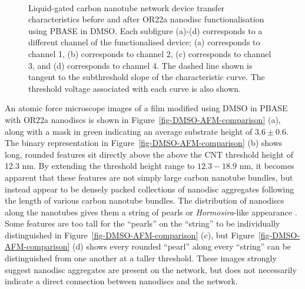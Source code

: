 \documentclass[
  a4paper,
]{scrbook}
\begin{document}
\begin{figure}
\begin{minipage}[t]{0.45\linewidth}
{{}

}

\end{minipage}%
%
\begin{minipage}[t]{0.01\linewidth}

{\centering 

~

}

\end{minipage}%

\caption{\label{fig-DMSO-TX}Liquid-gated carbon nanotube network device
transfer characteristics before and after OR22a nanodisc
functionalisation using PBASE in DMSO. Each subfigure (a)-(d)
corresponds to a different channel of the functionalised device; (a)
corresponds to channel 1, (b) corresponds to channel 2, (c) corresponds
to channel 3, and (d) corresponds to channel 4. The dashed line shown is
tangent to the subthreshold slope of the characteristic curve. The
threshold voltage associated with each curve is also shown.}

\end{figure}

An atomic force microscope images of a film modified using DMSO in PBASE
with OR22a nanodiscs is shown in Figure~\ref{fig-DMSO-AFM-comparison}
(a), along with a mask in green indicating an average substrate height
of \(3.6\pm0.6\). The binary representation in
Figure~\ref{fig-DMSO-AFM-comparison} (b) shows long, rounded features
sit directly above the above the CNT threshold height of 12.3 nm. By
extending the threshold height range to \(12.3-18.9\) nm, it becomes
apparent that these features are not simply large carbon nanotube
bundles, but instead appear to be densely packed collections of nanodisc
aggregates following the length of various carbon nanotube bundles. The
distribution of nanodiscs along the nanotubes gives them a string of
pearls or \emph{Hormosira}-like appearance
\autocite{NewZealandPlantConservationNetwork}. Some features are too
tall for the ``pearls'' on the ``string'' to be individually
distinguished in Figure~\ref{fig-DMSO-AFM-comparison} (c), but
Figure~\ref{fig-DMSO-AFM-comparison} (d) shows every rounded ``pearl''
along every ``string'' can be distinguished from one another at a taller
threshold. These images strongly suggest nanodisc aggregates are present
on the network, but does not necessarily indicate a direct connection
between nanodiscs and the network.
\end{document}
